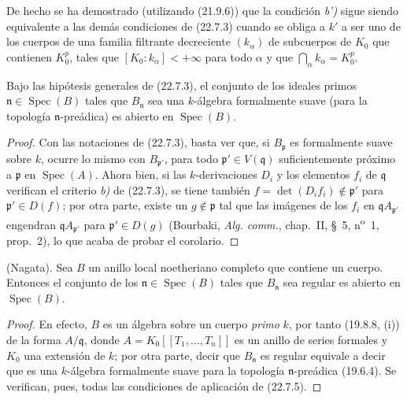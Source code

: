 
\begin{remark}[22.7.4]
\label{0.22.7.4-fr}
De hecho se ha demostrado (utilizando (21.9.6)) que la condición \emph{b')} sigue siendo
equivalente a las demás condiciones de (22.7.3) cuando se obliga a $k'$ a
ser uno de los cuerpos de una familia filtrante decreciente $(k_\alpha)$ de
subcuerpos de $K_0$ que contienen $K_0^p$, tales que
$[K_0:k_\alpha]<+\infty$ para todo $\alpha$ y que
$\bigcap_\alpha k_\alpha=K_0^p$.
\end{remark}

\begin{corollary}[22.7.5]
\label{0.22.7.5-fr}
Bajo las hipótesis generales de \textup{(22.7.3)}, el conjunto de los ideales primos
$\mathfrak n\in\operatorname{Spec}(B)$ tales que $B_{\mathfrak n}$ sea una
$k$-álgebra formalmente suave (para la topología $\mathfrak n$-preádica)
es abierto en $\operatorname{Spec}(B)$.
\end{corollary}

\begin{proof}
Con las notaciones de (22.7.3), basta ver que, si $B_{\mathfrak p}$
es formalmente suave sobre $k$, ocurre lo mismo con $B_{\mathfrak p'}$, para
todo $\mathfrak p'\in V(\mathfrak q)$ suficientemente próximo a $\mathfrak p$ en
$\operatorname{Spec}(A)$. Ahora bien, si las $k$-derivaciones $D_i$ y los elementos
$f_i$ de $\mathfrak q$ verifican el criterio \emph{b)} de (22.7.3), se tiene también
$f=\det(D_if_i)\notin\mathfrak p'$ para $\mathfrak p'\in D(f)$; por otra
parte, existe un $g\notin\mathfrak p$ tal que las imágenes de los $f_i$ en
$\mathfrak qA_{\mathfrak p'}$ engendran $\mathfrak qA_{\mathfrak p'}$ para
$\mathfrak p'\in D(g)$ (Bourbaki, \emph{Alg. comm.}, chap.~II, §~5,
n\textsuperscript{o}~1, prop.~2), lo que acaba de probar el corolario.
\end{proof}

\begin{corollary}[22.7.6]
\label{0.22.7.6-fr}
\textnormal{(Nagata).} Sea $B$ un anillo local noetheriano completo que contiene
un cuerpo. Entonces el conjunto de los $\mathfrak n\in\operatorname{Spec}(B)$ tales
que $B_{\mathfrak n}$ sea regular es abierto en $\operatorname{Spec}(B)$.
\end{corollary}

\begin{proof}
En efecto, $B$ es un álgebra sobre un cuerpo \emph{primo} $k$, por tanto (19.8.8, (i))
de la forma $A/\mathfrak q$, donde
$A=K_0[[T_1,\ldots,T_n]]$ es un anillo de series formales y $K_0$ una
extensión de $k$; por otra parte, decir que $B_{\mathfrak n}$ es regular
equivale a decir que es una $k$-álgebra formalmente suave para la topología
$\mathfrak n$-preádica (19.6.4). Se verifican, pues, todas las condiciones de aplicación de
(22.7.5).
\end{proof}

